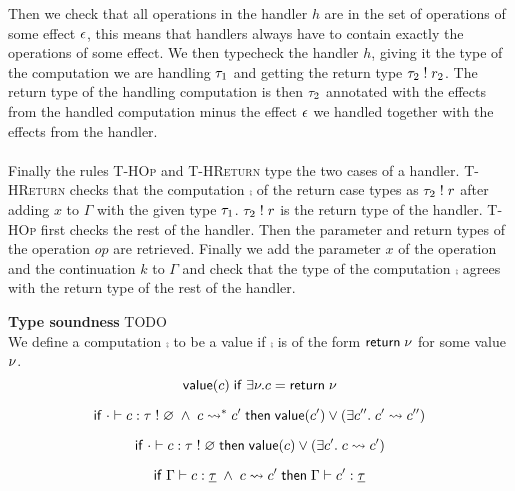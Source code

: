 {Then we check that all operations in the handler $h$ are in the set of operations of some effect $\epsilon$, this means that handlers always have to contain exactly the operations of some effect.
We then typecheck the handler $h$, giving it the type of the computation we are handling $\tau_1$  and getting the return type $\tau_2 \; ! \; r_2$.
The return type of the handling computation is then $\tau_2$ annotated with the effects from the handled computation minus the effect $\epsilon$ we handled together with the effects from the handler.
\\\\
Finally the rules \textsc{T-HOp} and \textsc{T-HReturn} type the two cases of a handler.
\textsc{T-HReturn} checks that the computation $\comp$ of the return case types as $\tau_2 \; ! \; r$ after adding $x$ to $\Gamma$ with the given type $\tau_1$. $\tau_2 \; ! \; r$ is the return type of the handler.
\textsc{T-HOp} first checks the rest of the handler. Then the parameter and return types of the operation $op$ are retrieved.
Finally we add the parameter $x$ of the operation and the continuation $k$ to $\Gamma$ and check that the type of the computation $\comp$ agrees with the return type of the rest of the handler.

\textbf{Type soundness}
TODO \\
We define a computation $\comp$ to be a value if $\comp$ is of the form $\mathsf{return} \; \nu$ for some value $\nu$.
	\[ \mathsf{value}(c) \;\mathsf{if}\; \exists \nu. c = \mathsf{return} \; \nu \]

\begin{theorem}
\[
	\mathsf{if}\;
		\cdot \vdash c : \tau \; ! \; \varnothing
		\;\land\;
		c \rightsquigarrow^* c'
	\;\mathsf{then}\;
		\mathsf{value}(c')
		\lor
		(\exists c''.\; c' \rightsquigarrow c'')
\]
\end{theorem}

\begin{lemma}[Progress]
\[
	\mathsf{if}\;
		\cdot \vdash c : \tau \; ! \; \varnothing
	\;\mathsf{then}\;
		\mathsf{value}(c)
		\lor
		(\exists c'.\; c \rightsquigarrow c')
\]
\end{lemma}

\begin{lemma}[Preservation]
\[
	\mathsf{if}\;
		\Gamma \vdash c : \underline{\tau}
		\;\land\;
		c \rightsquigarrow c'
	\;\mathsf{then}\;
		\Gamma \vdash c' : \underline{\tau}
\]
\end{lemma}

}
